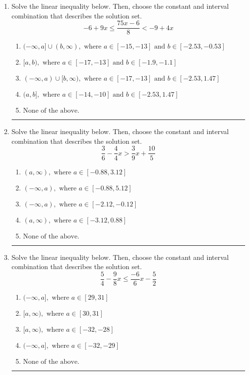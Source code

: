\documentclass[14pt]{extbook}
\newcommand{\litem}[1]{\item#1\hspace*{-1cm}\rule{\textwidth}{0.4pt}}
\begin{document}
\begin{enumerate}
{\begin{enumerate}[label=\Alph*.]
\end{enumerate} }
\litem{
Solve the linear inequality below. Then, choose the constant and interval combination that describes the solution set.\[ -6 + 9 x \leq \frac{75 x - 6}{8} < -9 + 4 x \]\begin{enumerate}[label=\Alph*.]
\item \( (-\infty, a] \cup (b, \infty), \text{ where } a \in [-15, -13] \text{ and } b \in [-2.53, -0.53] \)
\item \( [a, b), \text{ where } a \in [-17, -13] \text{ and } b \in [-1.9, -1.1] \)
\item \( (-\infty, a) \cup [b, \infty), \text{ where } a \in [-17, -13] \text{ and } b \in [-2.53, 1.47] \)
\item \( (a, b], \text{ where } a \in [-14, -10] \text{ and } b \in [-2.53, 1.47] \)
\item \( \text{None of the above.} \)

\end{enumerate} }
\litem{
Solve the linear inequality below. Then, choose the constant and interval combination that describes the solution set.\[ \frac{3}{6} - \frac{4}{4} x > \frac{3}{9} x + \frac{10}{5} \]\begin{enumerate}[label=\Alph*.]
\item \( (a, \infty), \text{ where } a \in [-0.88, 3.12] \)
\item \( (-\infty, a), \text{ where } a \in [-0.88, 5.12] \)
\item \( (-\infty, a), \text{ where } a \in [-2.12, -0.12] \)
\item \( (a, \infty), \text{ where } a \in [-3.12, 0.88] \)
\item \( \text{None of the above}. \)

\end{enumerate} }
\litem{
Solve the linear inequality below. Then, choose the constant and interval combination that describes the solution set.\[ \frac{5}{4} - \frac{9}{8} x \leq \frac{-6}{6} x - \frac{5}{2} \]\begin{enumerate}[label=\Alph*.]
\item \( (-\infty, a], \text{ where } a \in [29, 31] \)
\item \( [a, \infty), \text{ where } a \in [30, 31] \)
\item \( [a, \infty), \text{ where } a \in [-32, -28] \)
\item \( (-\infty, a], \text{ where } a \in [-32, -29] \)
\item \( \text{None of the above}. \)


\end{enumerate}}
\end{enumerate}
\end{document}
